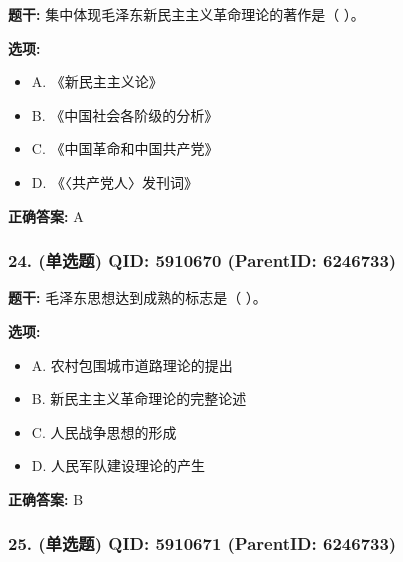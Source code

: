 \documentclass[12pt,UTF8]{ctexart}
\begin{document}
\textbf{题干:}
集中体现毛泽东新民主主义革命理论的著作是（ ）。



\textbf{选项:}
\begin{itemize}[leftmargin=*]

  \item A. 《新民主主义论》

  \item B. 《中国社会各阶级的分析》

  \item C. 《中国革命和中国共产党》

  \item D. 《〈共产党人〉发刊词》

\end{itemize}

\textbf{正确答案:}
A

\vspace{0.3em}\hrulefill\vspace{0.7em}

\subsubsection*{24. (单选题) \small QID: 5910670 (ParentID: 6246733)}

\textbf{题干:}
毛泽东思想达到成熟的标志是（ ）。



\textbf{选项:}
\begin{itemize}[leftmargin=*]

  \item A. 农村包围城市道路理论的提出

  \item B. 新民主主义革命理论的完整论述

  \item C. 人民战争思想的形成

  \item D. 人民军队建设理论的产生

\end{itemize}

\textbf{正确答案:}
B

\vspace{0.3em}\hrulefill\vspace{0.7em}

\subsubsection*{25. (单选题) \small QID: 5910671 (ParentID: 6246733)}
\end{document}
